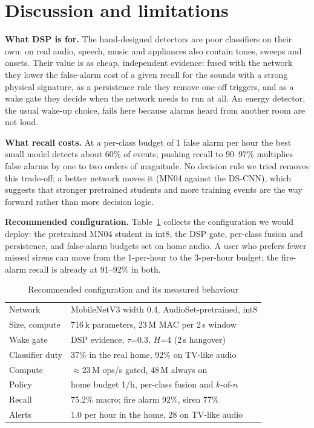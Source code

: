 \documentclass[conference]{IEEEtran}
\begin{document}
\section{Discussion and limitations}
\textbf{What DSP is for.} The hand-designed detectors are poor classifiers on their own: on real
audio, speech, music and appliances also contain tones, sweeps and onsets. Their value is as
cheap, independent evidence: fused with the network they lower the false-alarm cost of a given
recall for the sounds with a strong physical signature, as a persistence rule they remove one-off
triggers, and as a wake gate they decide when the network needs to run at all. An energy
detector, the usual wake-up choice, fails here because alarms heard from another room are not
loud.

\textbf{What recall costs.} At a per-class budget of 1 false alarm per hour the best small model
detects about 60\% of events; pushing recall to 90--97\% multiplies false alarms by one to two
orders of magnitude. No decision rule we tried removes this trade-off; a better network moves it
(MN04 against the DS-CNN), which suggests that stronger pretrained students and more training
events are the way forward rather than more decision logic.

\textbf{Recommended configuration.} Table~\ref{tab:rec} collects the configuration we would
deploy: the pretrained MN04 student in int8, the DSP gate, per-class fusion and persistence, and
false-alarm budgets set on home audio. A user who prefers fewer missed sirens can move from the
1-per-hour to the 3-per-hour budget; the fire-alarm recall is already at 91--92\% in both.

\begin{table}[t]\centering\caption{Recommended configuration and its measured behaviour}\label{tab:rec}
\setlength{\tabcolsep}{3pt}
\begin{tabular}{ll}\toprule
Network & MobileNetV3 width 0.4, AudioSet-pretrained, int8 \\
Size, compute & 716\,k parameters, 23\,M MAC per 2\,s window \\
Wake gate & DSP evidence, $\tau$=0.3, $H$=4 (2\,s hangover) \\
Classifier duty & 37\% in the real home, 92\% on TV-like audio \\
Compute & $\approx$23\,M ops/s gated, 48\,M always on \\
Policy & home budget 1/h, per-class fusion and $k$-of-$n$ \\
Recall & 75.2\% macro; fire alarm 92\%, siren 77\% \\
Alerts & 1.0 per hour in the home, 28 on TV-like audio \\ \bottomrule
\end{tabular}\end{table}
\end{document}
